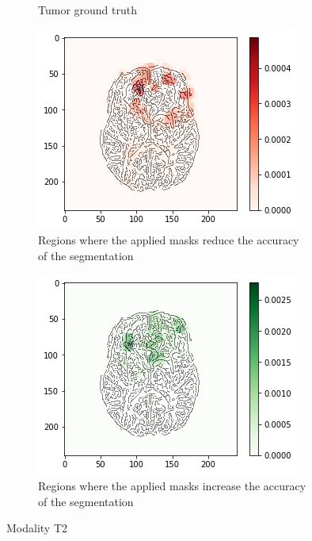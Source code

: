 \begin{figure}[H]
\begin{subfigure}[t]{.4\textwidth}
        \caption{Tumor ground truth}
    \end{subfigure}
    \begin{subfigure}[t]{.45\textwidth}
        \centering
        \includegraphics[width=\linewidth]{chapters/06_hdm/c_Brats18_2013_17_1_L1/53.png}
        \caption{Regions where the applied masks reduce the accuracy of the segmentation}
    \end{subfigure}\hspace{1cm}%
    \begin{subfigure}[t]{.45\textwidth}
        \centering
        \includegraphics[width=\linewidth]{chapters/06_hdm/c_Brats18_2013_17_1_L1/54.png}
        \caption{Regions where the applied masks increase the accuracy of the segmentation}
    \end{subfigure}
    \caption{Modality T2}
\end{figure}


